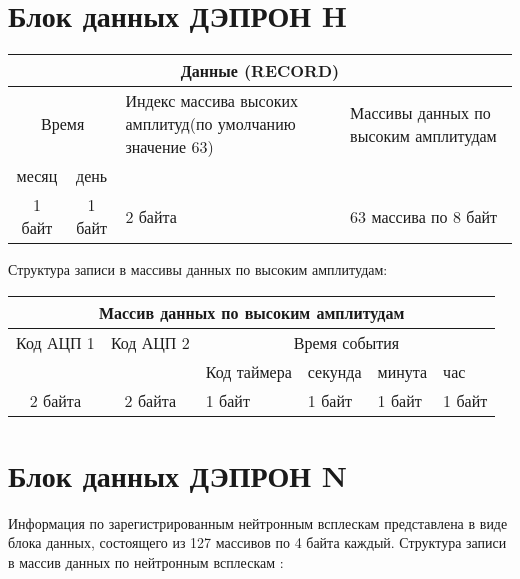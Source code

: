 \section{Блок данных ДЭПРОН H}


\small
\begin{center}
	\begin{tabularx}{\textwidth}{|c|c|X|X|}
		\hline
		\multicolumn{4}{|c|}{Данные 
		(RECORD)}                                                               
		                           \\
		 \hline
		\multicolumn{2}{|c|}{Время} & Индекс массива высоких амплитуд(по 
		умолчанию значение 63) & Массивы данных по высоким амплитудам \\ 
		\cline{1-2}
		месяц  &        день        
		&                                                           &  \\ \hline
		1 байт &       1 байт       & 2 
		байта                                                   & 63 массива  
		по 8 байт                \\ \hline
	\end{tabularx}  
\end{center}
\normalsize
	



Структура записи в массивы данных по высоким амплитудам:

\small
\begin{center}
	\begin{tabularx}{\textwidth}{|c|c|X|X|X|X|}
		\hline
		\multicolumn{6}{|c|}{Массив данных по высоким амплитудам}       \\ 
		\hline
		Код АЦП 1 & Код АЦП 2 &   \multicolumn{4}{c|}{Время события}    \\ 
		\cline{3-6}
		          &           & Код таймера & секунда & минута & час    \\ 
		          \hline
		 2 байта  &  2 байта  & 1 байт      & 1 байт  & 1 байт & 1 байт \\ 
		 \hline
	\end{tabularx}  
\end{center}
\normalsize




\section{Блок данных ДЭПРОН N}

Информация по зарегистрированным нейтронным всплескам представлена в виде блока данных, состоящего из 127 массивов  по 4 байта каждый.
Структура записи в массив данных по нейтронным всплескам :

